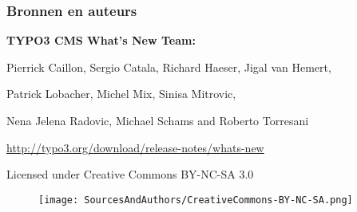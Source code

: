 \begin{frame}[fragile]
	\frametitle{Bronnen en auteurs}

	\vspace{-0.6cm}

	\centerline{\textbf{TYPO3 CMS What's New Team:}}

	\begin{center}
		\centerline{Pierrick Caillon, Sergio Catala, Richard Haeser, Jigal van Hemert,}
		\centerline{Patrick Lobacher, Michel Mix, Sinisa Mitrovic,}
		\centerline{Nena Jelena Radovic, Michael Schams and Roberto Torresani}
	\end{center}

	\vspace{0.4cm}

	\smaller\begin{center}\url{http://typo3.org/download/release-notes/whats-new}\end{center}\normalsize

	\vspace{1cm}

	\smaller\begin{center}Licensed under Creative Commons BY-NC-SA 3.0\end{center}\normalsize
	\begin{figure}\vspace*{-0.4cm}
		\texttt{[image: SourcesAndAuthors/CreativeCommons-BY-NC-SA.png]}
	\end{figure}

\end{frame}

